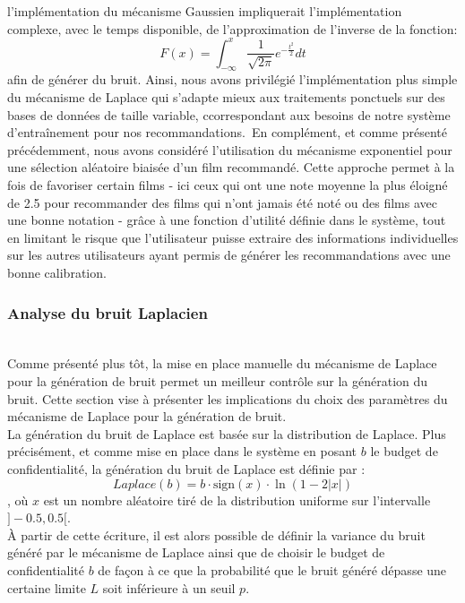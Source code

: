 \documentclass{article}
\begin{document}
l'implémentation du mécanisme Gaussien impliquerait l'implémentation complexe, avec le temps disponible, de l'approximation de l'inverse de la fonction:
\begin{equation}
    F(x) = \int_{-\infty}^{x} \frac{1}{\sqrt{2\pi}} e^{-\frac{t^2}{2}} dt
\end{equation}
afin de générer du bruit. Ainsi, nous avons privilégié l'implémentation plus simple du mécanisme de Laplace qui s’adapte mieux aux traitements
ponctuels sur des bases de données de taille variable, ccorrespondant aux besoins de notre système d'entraînement pour nos recommandations.\
En complément, et comme présenté précédemment, nous avons considéré l'utilisation du mécanisme exponentiel pour une sélection aléatoire biaisée d'un film recommandé.
Cette approche permet à la fois de favoriser certain films - ici ceux qui ont une note moyenne la plus éloigné de 2.5 pour recommander des films qui n'ont jamais été noté ou des
films avec une bonne notation - grâce à une fonction d'utilité définie dans le système, tout en limitant le risque que
l'utilisateur puisse extraire des informations individuelles sur les autres utilisateurs ayant permis de générer les recommandations avec une bonne
calibration.



























\subsubsection{Analyse du bruit Laplacien}
$ $\\
Comme présenté plus tôt, la mise en place manuelle du mécanisme de Laplace pour la génération de bruit permet un meilleur contrôle sur la génération du bruit. Cette section vise à présenter
les implications du choix des paramètres du mécanisme de Laplace pour la génération de bruit.\\
La génération du bruit de Laplace est basée sur la distribution de Laplace. Plus précisément, et comme mise en place dans le système en posant $b$ le budget de confidentialité, la génération du bruit de Laplace est définie par :
\begin{equation}
    Laplace(b) = b \cdot \text{sign}(x) \cdot \ln(1 - 2|x|)
    \label{eq:laplace}
\end{equation}
, où $x$ est un nombre aléatoire tiré de la distribution uniforme sur l'intervalle \( ]-0.5, 0.5[ \).\\
À partir de cette écriture, il est alors possible de définir la variance du bruit généré par le mécanisme de Laplace ainsi que de choisir le budget de confidentialité 
$b$ de façon à ce que la probabilité que le bruit généré dépasse une certaine limite $L$ soit inférieure à un seuil $p$.\\
\end{document}
